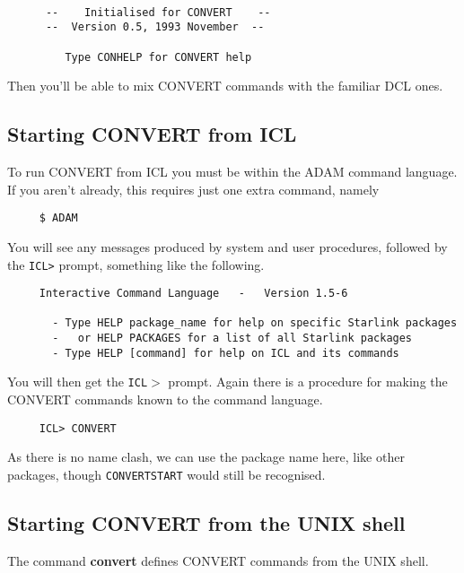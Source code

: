 \small
\begin{verbatim}

      --    Initialised for CONVERT    --
      --  Version 0.5, 1993 November  --

         Type CONHELP for CONVERT help 
\end{verbatim}
\normalsize 
Then you'll be able to mix {\footnotesize CONVERT} commands with the
familiar {\footnotesize DCL} ones. 

\subsection{Starting CONVERT from ICL}

To run {\footnotesize CONVERT} from {\footnotesize ICL} you must be
within the {\footnotesize ADAM} command language.  If you aren't
already, this requires just one extra command, namely 

\small
\begin{verbatim}
     $ ADAM
\end{verbatim}
\normalsize
You will see any messages produced by system and user procedures, followed
by the {\tt ICL>} prompt, something like the following.

\small
\begin{verbatim}
     Interactive Command Language   -   Version 1.5-6

       - Type HELP package_name for help on specific Starlink packages
       -   or HELP PACKAGES for a list of all Starlink packages
       - Type HELP [command] for help on ICL and its commands

\end{verbatim}
\normalsize
You will then get the {\tt ICL$>$} prompt.
Again there is a procedure for making the {\footnotesize CONVERT}
commands known to the command language.

\small
\begin{verbatim}
     ICL> CONVERT
\end{verbatim}
\normalsize
As there is no name clash, we can use the package name here, like other
packages, though {\tt CONVERTSTART} would still be recognised. 

\subsection{Starting CONVERT from the UNIX shell}

The command {\bf convert} defines {\footnotesize CONVERT} commands from
the UNIX shell.

